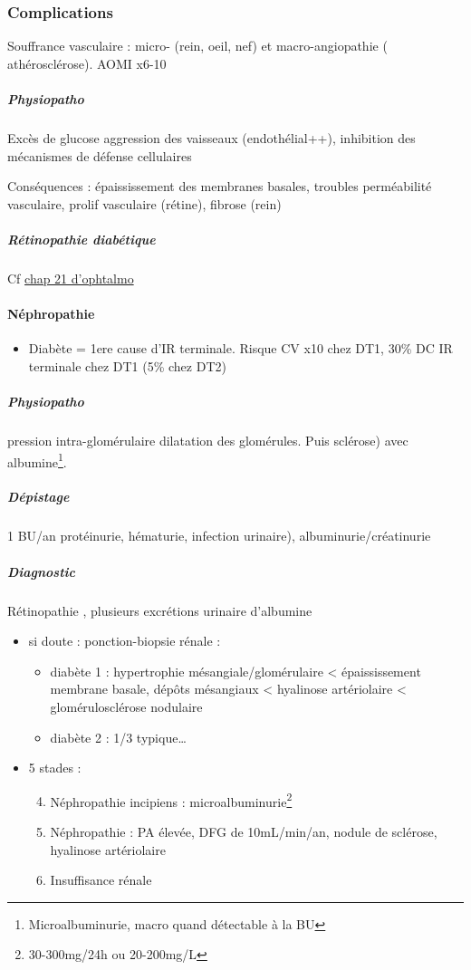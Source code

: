 \documentclass[11pt]{article}
\begin{document}
\subsubsection{Complications}
\label{sec:org3dc2e27}
Souffrance vasculaire : micro- (rein, oeil, nef) et macro-angiopathie (\inc
athérosclérose). AOMI x6-10

\subparagraph{Physiopatho}
\label{sec:orgb33d2eb}
Excès de glucose \thus aggression des vaisseaux (endothélial++), inhibition des
mécanismes de défense cellulaires

Conséquences : épaississement des membranes basales, troubles perméabilité
vasculaire, prolif vasculaire (rétine), fibrose (rein)

\subparagraph{Rétinopathie diabétique}
\label{sec:org6cad983}
Cf \hyperref[orgd703da6]{chap 21 d'ophtalmo}
\paragraph{Néphropathie}
\label{sec:orga3ea97d}
\begin{itemize}
\item Diabète = 1ere cause d'IR terminale. Risque CV x10 chez DT1, 30\% DC IR terminale
chez DT1 (5\% chez DT2)
\end{itemize}

\subparagraph{Physiopatho}
\label{sec:orgc74abb0}
\inc pression intra-glomérulaire \thus dilatation des glomérules. Puis sclérose) avec \inc albumine\footnote{Microalbuminurie, macro quand détectable à la BU}.

\subparagraph{Dépistage}
\label{sec:orgb7afc77}
1 BU/an protéinurie, hématurie, infection urinaire), albuminurie/créatinurie 
\subparagraph{Diagnostic}
\label{sec:org98698af}
Rétinopathie , plusieurs excrétions urinaire d'albumine \inc 
\begin{itemize}
\item si doute : ponction-biopsie rénale : 
\begin{itemize}
\item diabète 1 : hypertrophie mésangiale/glomérulaire < épaississement membrane basale, dépôts
mésangiaux < hyalinose artériolaire < glomérulosclérose nodulaire
\item diabète 2 : 1/3 typique\ldots{}
\end{itemize}
\item 5 stades : 
\begin{enumerate}
\setcounter{enumi}{3}
\item Néphropathie incipiens : microalbuminurie\footnote{30-300mg/24h ou 20-200mg/L}
\item Néphropathie : PA élevée, DFG \dec de 10mL/min/an, nodule de sclérose,
hyalinose artériolaire
\item Insuffisance rénale
\end{enumerate}
\end{itemize}
\end{document}
